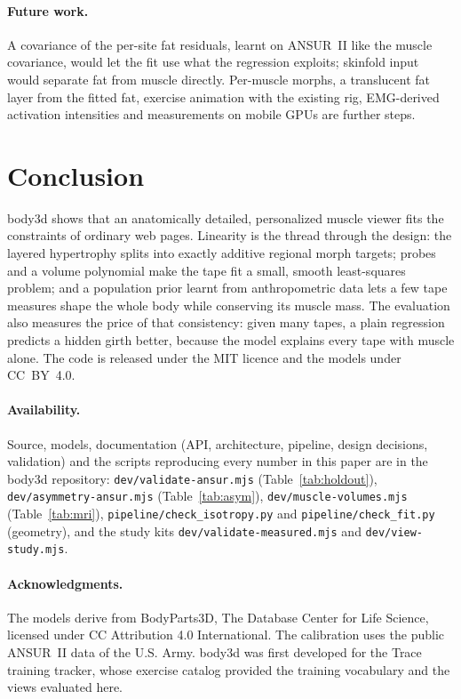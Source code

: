\documentclass[10pt,twocolumn]{article}
\newcommand{\code}[1]{\texttt{#1}}
\begin{document}
\paragraph{Future work.} A covariance of the per-site fat residuals, learnt on ANSUR~II like the
muscle covariance, would let the fit use what the regression exploits; skinfold input would separate
fat from muscle directly. Per-muscle morphs, a translucent fat layer from the fitted fat, exercise
animation with the existing rig, EMG-derived activation intensities and measurements on mobile GPUs
are further steps.

\section{Conclusion}

body3d shows that an anatomically detailed, personalized muscle viewer fits the constraints of
ordinary web pages. Linearity is the thread through the design: the layered hypertrophy splits into
exactly additive regional morph targets; probes and a volume polynomial make the tape fit a small,
smooth least-squares problem; and a population prior learnt from anthropometric data lets a few tape
measures shape the whole body while conserving its muscle mass. The evaluation also measures the
price of that consistency: given many tapes, a plain regression predicts a hidden girth better,
because the model explains every tape with muscle alone. The code is released under the MIT licence
and the models under CC~BY~4.0.

\paragraph{Availability.}
{\raggedright Source, models, documentation (API, architecture, pipeline, design decisions, validation) and the
scripts reproducing every number in this paper are in the body3d repository:
\code{dev/validate-ansur.mjs} (Table~\ref{tab:holdout}), \code{dev/asymmetry-ansur.mjs}
(Table~\ref{tab:asym}), \code{dev/muscle-volumes.mjs} (Table~\ref{tab:mri}),
\code{pipeline/check\_isotropy.py} and \code{pipeline/check\_fit.py} (geometry), and the study kits
\code{dev/validate-measured.mjs} and \code{dev/view-study.mjs}.\par}

\paragraph{Acknowledgments.}
The models derive from BodyParts3D, \textcopyright{} The Database Center for Life Science, licensed
under CC Attribution 4.0 International. The calibration uses the public ANSUR~II data of the U.S.
Army. body3d was first developed for the Trace training tracker, whose exercise catalog provided the
training vocabulary and the views evaluated here.

\small


\end{document}

